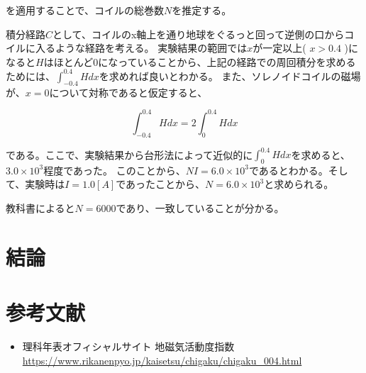 \documentclass[uplatex,11pt]{jsarticle}
\begin{document}
を適用することで、コイルの総巻数$N$を推定する。

積分経路$C$として、コイルのx軸上を通り地球をぐるっと回って逆側の口からコイルに入るような経路を考える。
実験結果の範囲では$x$が一定以上( $ x \gt 0.4 $ )になると$H$はほとんど0になっていることから、上記の経路での周回積分を求めるためには、$\int^{0.4}_{-0.4} H dx$を求めれば良いとわかる。
また、ソレノイドコイルの磁場が、$x=0$について対称であると仮定すると、

\[
\int^{0.4}_{-0.4} H dx = 2 \int^{0.4}_0 H dx
\]

である。ここで、実験結果から台形法によって近似的に$\int^{0.4}_0 H dx$を求めると、$3.0 \times 10 ^ 3 $程度であった。
このことから、$NI = 6.0 \times 10^3$であるとわかる。そして、実験時は$I = 1.0[A]$であったことから、$N = 6.0 \times 10^3$と求められる。

教科書によると$N = 6000$であり、一致していることが分かる。

\section{結論}



\section{参考文献}

\begin{itemize}
    \item 理科年表オフィシャルサイト 地磁気活動度指数 \url{https://www.rikanenpyo.jp/kaisetsu/chigaku/chigaku_004.html}
\end{itemize}
\end{document}
